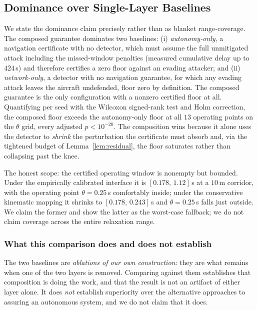 \subsection{Dominance over Single-Layer Baselines}
\label{sec:dominance}
We state the dominance claim precisely rather than as blanket range-coverage.
The composed guarantee dominates two baselines: (i) \emph{autonomy-only}, a
navigation certificate with no detector, which must assume the full unmitigated
attack including the missed-window penalties (measured cumulative delay up to
$424$\,s) and therefore certifies a zero floor against an evading attacker; and
(ii) \emph{network-only}, a detector with no navigation guarantee, for which
any evading attack leaves the aircraft undefended, floor zero by definition.
The composed guarantee is the only configuration with a nonzero
certified floor at all. Quantifying per seed with the Wilcoxon signed-rank test
and Holm correction, the composed floor exceeds the autonomy-only floor at all
$13$ operating points on the $\theta$ grid, every adjusted $p<10^{-20}$. The
composition wins because it alone uses the detector to \emph{shrink} the
perturbation the certificate must absorb and, via the tightened budget of
Lemma~\ref{lem:residual}, the floor saturates rather than collapsing past the
knee.

The honest scope: the certified operating window is nonempty but bounded. Under
the empirically calibrated interface it is $[0.178,\,1.12]$\,s at a $10$\,m
corridor, with the operating point $\theta=0.25$\,s comfortably inside; under
the conservative kinematic mapping it shrinks to $[0.178,\,0.243]$\,s and
$\theta=0.25$\,s falls just outside. We claim the former and show the latter as
the worst-case fallback; we do not claim coverage across the entire relaxation
range.

\subsubsection*{What this comparison does and does not establish}
The two baselines are \emph{ablations of our own construction}: they are what
remains when one of the two layers is removed. Comparing against them
establishes that composition is doing the work, and that the result is not an
artifact of either layer alone. It does \emph{not} establish superiority over
the alternative approaches to assuring an autonomous system, and we do not claim
that it does.

